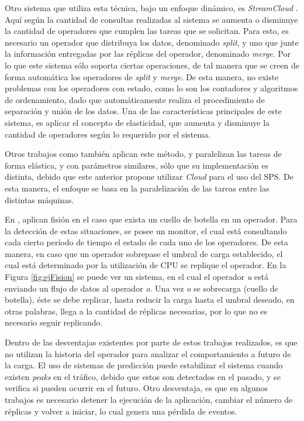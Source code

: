 Otro sistema que utiliza esta técnica, bajo un enfoque dinámico, es \textit{StreamCloud} \citep{GulisanoJPSV12}. Aquí según la cantidad de consultas realizadas al sistema se aumenta o disminuye la cantidad de operadores que cumplen las tareas que se solicitan. Para esto, es necesario un operador que distribuya los datos, denominado \textit{split}, y uno que junte la información entregadas por las réplicas del operador, denominado \textit{merge}. Por lo que este sistema sólo soporta ciertas operaciones, de tal manera que se creen de forma automática los operadores de \textit{split} y \textit{merge}. De esta manera, no existe problemas con los operadores con estado, como lo son los contadores y algoritmos de ordenamiento, dado que automáticamente realiza el procedimiento de separación y unión de los datos. Una de las características principales de este sistema, es aplicar el concepto de elasticidad, que aumenta y disminuye la cantidad de operadores según lo requerido por el sistema.

Otros trabajos como \citep{GedikSHW14, SchneiderAGBW09} también aplican este método, y paralelizan las tareas de forma elástica, y con parámetros similares, sólo que su implementación es distinta, debido que este anterior propone utilizar \textit{Cloud} para el uso del SPS. De esta manera, el enfoque se basa en la paralelización de las tareas entre las distintas máquinas.

En \citep{FernandezMKP13}, aplican fisión en el caso que exista un cuello de botella en un operador. Para la detección de estas situaciones, se posee un monitor, el cual está consultando cada cierto período de tiempo el estado de cada uno de los operadores. De esta manera, en caso que un operador sobrepase el umbral de carga establecido, el cual está determinado por la utilización de CPU se replique el operador. En la Figura \ref{fig:ejFision} se puede ver un sistema, en el cual el operador \textit{u} está enviando un flujo de datos al operador \textit{o}. Una vez \textit{o} se sobrecarga (cuello de botella), éste se debe replicar, hasta reducir la carga hasta el umbral deseado, en otras palabras, llega a la cantidad de réplicas necesarias, por lo que no es necesario seguir replicando.

Dentro de las desventajas existentes por parte de estos trabajos realizados, es que no utilizan la historia del operador para analizar el comportamiento a futuro de la carga. El uso de sistemas de predicción puede estabilizar el sistema cuando existen \textit{peaks} en el tráfico, debido que estos son detectados en el pasado, y se verifica si pueden ocurrir en el futuro. Otro desventaja, es que en algunos trabajos es necesario detener la ejecución de la aplicación, cambiar el número de réplicas y volver a iniciar, lo cual genera una pérdida de eventos.


